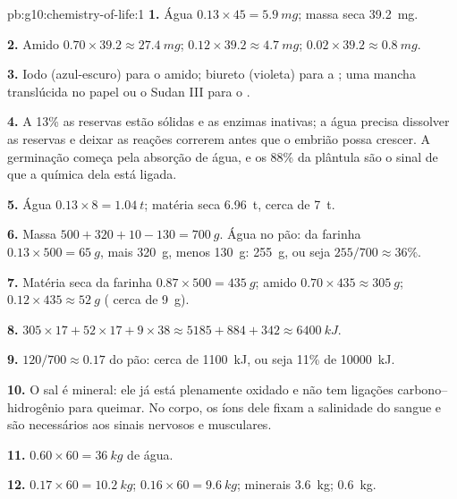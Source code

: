 \begin{solution}{pb:g10:chemistry-of-life:1}
\textbf{1.} Água $0.13 \times 45 = \qty{5.9}{mg}$; massa seca
\qty{39.2}{mg}.

\textbf{2.} Amido $0.70 \times 39.2 \approx \qty{27.4}{mg}$; 
$0.12 \times 39.2 \approx \qty{4.7}{mg}$;  $0.02 \times 39.2
\approx \qty{0.8}{mg}$.

\textbf{3.} Iodo (azul-escuro) para o amido; biureto (violeta) para a
; uma mancha translúcida no papel ou o Sudan III para o .

\textbf{4.} A 13\% as reservas estão sólidas e as enzimas inativas; a
água precisa dissolver as reservas e deixar as reações correrem antes
que o embrião possa crescer. A germinação começa pela absorção de água,
e os 88\% da plântula são o sinal de que a química dela está ligada.

\textbf{5.} Água $0.13 \times 8 = \qty{1.04}{t}$; matéria seca
\qty{6.96}{t}, cerca de \qty{7}{t}.

\textbf{6.} Massa $500 + 320 + 10 - 130 = \qty{700}{g}$. Água no pão:
da farinha $0.13 \times 500 = \qty{65}{g}$, mais \qty{320}{g}, menos
\qty{130}{g}: \qty{255}{g}, ou seja $255/700 \approx 36\%$.

\textbf{7.} Matéria seca da farinha $0.87 \times 500 = \qty{435}{g}$;
amido $0.70 \times 435 \approx \qty{305}{g}$;  $0.12 \times 435 \approx
\qty{52}{g}$ ( cerca de \qty{9}{g}).

\textbf{8.} $305 \times 17 + 52 \times 17 + 9 \times 38 \approx 5185 +
884 + 342 \approx \qty{6400}{kJ}$.

\textbf{9.} $120/700 \approx 0.17$ do pão: cerca de \qty{1100}{kJ}, ou
seja 11\% de \qty{10000}{kJ}.

\textbf{10.} O sal é mineral: ele já está plenamente oxidado e não tem
ligações carbono--hidrogênio para queimar. No corpo, os íons dele fixam
a salinidade do sangue e são necessários aos sinais nervosos e musculares.

\textbf{11.} $0.60 \times 60 = \qty{36}{kg}$ de água.

\textbf{12.}  $0.17 \times 60 = \qty{10.2}{kg}$;  $0.16
\times 60 = \qty{9.6}{kg}$; minerais \qty{3.6}{kg}; 
\qty{0.6}{kg}.


\end{solution}

